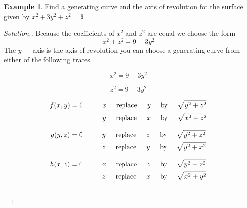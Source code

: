 \documentclass[11pt,a4paper]{article}
\theoremstyle{definition}
\newtheorem{exa}[thm]{Example}
\newenvironment{solution}
  {\renewcommand{\qedsymbol}{}\begin{proof}[\textit{Solution}.]}
  {\end{proof}}
\begin{document}
\begin{exa}


Find a generating curve and the axis of revolution for the surface given by $x^2 + 3y^2 + z^2 = 9$
\end{exa}


\begin{solution}


Because the coefficients of $x^2$ and $z^2$ are equal we choose the form $$x^2 + z^2 = 9 - 3y^2$$
The $y-$ axis is the axis of revolution you can choose a generating curve from either of the following traces

$$x^2 = 9 -3y^2$$

$$z^2 = 9 - 3y^2$$

\begin{align*}
f(x,y) = 0 \hspace{1cm} & x \hspace{0.5cm} \text{replace}\hspace{0.5cm} y \hspace{0.5cm} \text{by}\hspace{0.5cm} \sqrt{y^2 + z^2}\\
& y \hspace{0.5cm} \text{replace}\hspace{0.5cm} x \hspace{0.5cm} \text{by}\hspace{0.5cm} \sqrt{x^2 + z^2}\\
\end{align*}

\begin{align*}
g(y,z) =0\hspace{1cm} & y \hspace{0.5cm} \text{replace}\hspace{0.5cm} z \hspace{0.5cm} \text{by}\hspace{0.5cm} \sqrt{y^2 + z^2}\\
& z \hspace{0.5cm} \text{replace}\hspace{0.5cm} y \hspace{0.5cm} \text{by}\hspace{0.5cm} \sqrt{y^2 + x^2}\\
\end{align*}

\begin{align*}
h(x,z) = 0 \hspace{1cm} & x \hspace{0.5cm} \text{replace}\hspace{0.5cm} z \hspace{0.5cm} \text{by}\hspace{0.5cm} \sqrt{y^2 + z^2}\\
& z \hspace{0.5cm} \text{replace}\hspace{0.5cm} x \hspace{0.5cm} \text{by}\hspace{0.5cm} \sqrt{x^2 + y^2}\\\\
\end{align*}

\pagebreak
\end{solution}
\end{document}
